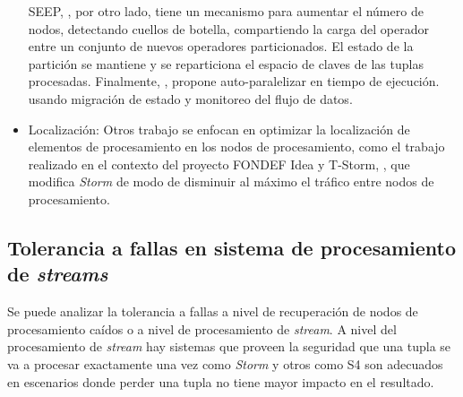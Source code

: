 \begin{itemize}
SEEP, \cite{CastroFernandezISFT}, por otro lado, tiene un mecanismo para aumentar el número de nodos, detectando cuellos de botella, compartiendo la carga del operador entre un conjunto de nuevos operadores particionados. El estado de la partición se mantiene y se reparticiona el espacio de claves de las tuplas procesadas. Finalmente, \cite{GedikESDSP}, propone auto-paralelizar en tiempo de ejecución. usando migración de estado y monitoreo del flujo de datos.
\item Localización: Otros trabajo se enfocan en optimizar la localización de elementos de procesamiento en los nodos de procesamiento, como el trabajo realizado en el contexto del proyecto FONDEF Idea y T-Storm, \cite{XuTStorm}, que modifica \textit{Storm} de modo de disminuir al máximo el tráfico entre nodos de procesamiento.
\end{itemize}

\subsection{Tolerancia a fallas en sistema de procesamiento de \textit{streams}}
\label{arte:ToleranciaFallasSPS}

Se puede analizar la tolerancia a fallas a nivel de recuperación de nodos de procesamiento caídos o a nivel de procesamiento de \textit{stream}. A nivel del procesamiento de \textit{stream} hay sistemas que proveen la seguridad que una tupla se va a procesar exactamente una vez como \textit{Storm} y otros como S4 \cite{NeumeyerS4} son adecuados en escenarios donde perder una tupla no tiene mayor impacto en el resultado.

